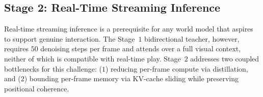 \subsection{Stage 2: Real-Time Streaming Inference}
\label{sec:stage2}

Real-time streaming inference is a prerequisite for any world model that aspires to support genuine interaction. The Stage~$1$ bidirectional teacher, however, requires $50$ denoising steps per frame and attends over a full visual context, neither of which is compatible with real-time play. Stage~$2$ addresses two coupled bottlenecks for this challenge: ($1$) reducing per-frame compute via distillation, and ($2$) bounding per-frame memory via KV-cache sliding while preserving positional coherence.


